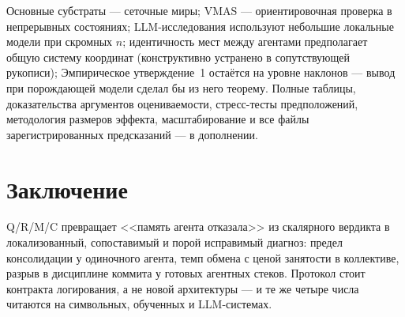 \documentclass[letterpaper]{article} %
\begin{document}
Основные субстраты --- сеточные миры; VMAS --- ориентировочная
проверка в непрерывных состояниях; LLM-исследования используют
небольшие локальные модели при скромных $n$; идентичность мест между
агентами предполагает общую систему координат (конструктивно
устранено в сопутствующей рукописи); Эмпирическое утверждение~1
остаётся на уровне наклонов --- вывод при порождающей модели сделал
бы из него теорему. Полные таблицы, доказательства аргументов
оцениваемости, стресс-тесты предположений, методология размеров
эффекта, масштабирование и все файлы зарегистрированных предсказаний
--- в дополнении.

\section{Заключение}

Q/R/M/C превращает <<память агента отказала>> из скалярного вердикта
в локализованный, сопоставимый и порой исправимый диагноз: предел
консолидации у одиночного агента, темп обмена с ценой занятости в
коллективе, разрыв в дисциплине коммита у готовых агентных стеков.
Протокол стоит контракта логирования, а не новой архитектуры --- и те
же четыре числа читаются на символьных, обученных и LLM-системах.



% 
\end{document}
